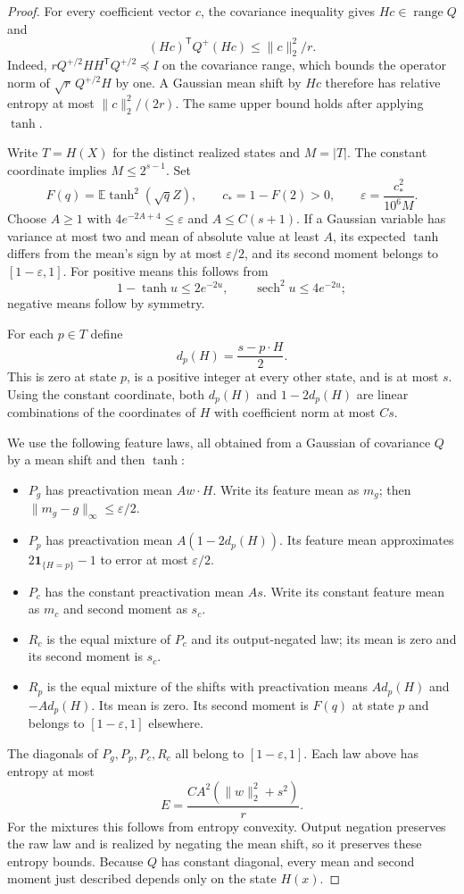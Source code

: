 \begin{proof}
For every coefficient vector $c$, the covariance inequality gives
$Hc\in\operatorname{range}Q$ and
\[
 (Hc)^{\mathsf T}Q^+(Hc)\le\|c\|_2^2/r.
\]
Indeed, $rQ^{+/2}HH^{\mathsf T}Q^{+/2}\preceq I$ on the
covariance range, which bounds the operator norm of
$\sqrt r\,Q^{+/2}H$ by one. A Gaussian mean shift by $Hc$
therefore has relative entropy at most $\|c\|_2^2/(2r)$.
The same upper bound holds after applying $\tanh$.

Write $T=H(X)$ for the distinct realized states and $M=|T|$.
The constant coordinate implies $M\le2^{s-1}$. Set
\[
 F(q)=\mathbb E\tanh^2(\sqrt qZ),\qquad
 c_*=1-F(2)>0,\qquad
 \varepsilon=\frac{c_*^2}{10^6M}.
\]
Choose $A\ge1$ with
$4e^{-2A+4}\le\varepsilon$ and $A\le C(s+1)$.
If a Gaussian variable has variance at most two and mean of absolute
value at least $A$, its expected $\tanh$ differs from the mean's
sign by at most $\varepsilon/2$, and its second moment belongs to
$[1-\varepsilon,1]$. For positive means this follows from
\[
 1-\tanh u\le2e^{-2u},\qquad
 \operatorname{sech}^2u\le4e^{-2u};
\]
negative means follow by symmetry.

For each $p\in T$ define
\[
 d_p(H)=\frac{s-p\cdot H}{2}.
\]
This is zero at state $p$, is a positive integer at every other state,
and is at most $s$. Using the constant coordinate, both $d_p(H)$
and $1-2d_p(H)$ are linear combinations of the coordinates of $H$
with coefficient norm at most $Cs$.

We use the following feature laws, all obtained from a Gaussian of
covariance $Q$ by a mean shift and then $\tanh$:
\begin{itemize}
\item $P_g$ has preactivation mean $Aw\cdot H$. Write its feature
mean as $m_g$; then $\|m_g-g\|_\infty\le\varepsilon/2$.
\item $P_p$ has preactivation mean $A(1-2d_p(H))$. Its feature
mean approximates $2\boldsymbol1_{\{H=p\}}-1$ to error at most
$\varepsilon/2$.
\item $P_c$ has the constant preactivation mean $As$. Write its
constant feature mean as $m_c$ and second moment as $s_c$.
\item $R_c$ is the equal mixture of $P_c$ and its output-negated
law; its mean is zero and its second moment is $s_c$.
\item $R_p$ is the equal mixture of the shifts with preactivation
means $Ad_p(H)$ and $-Ad_p(H)$. Its mean is zero. Its second
moment is $F(q)$ at state $p$ and belongs to $[1-\varepsilon,1]$
elsewhere.
\end{itemize}
The diagonals of $P_g,P_p,P_c,R_c$ all belong to
$[1-\varepsilon,1]$. Each law above has entropy at most
\[
 E=\frac{CA^2(\|w\|_2^2+s^2)}r.
\]
For the mixtures this follows from entropy convexity. Output negation
preserves the raw law and is realized by negating the mean shift,
so it preserves these entropy bounds. Because $Q$ has constant
diagonal, every mean and second moment just described depends only
on the state $H(x)$.


\end{proof}
